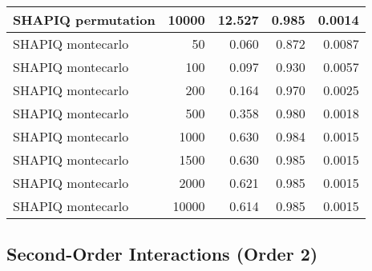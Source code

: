 \documentclass{article}
\begin{document}
\begin{table}[h!]
\begin{tabular}{lrrrr}
SHAPIQ permutation & 10000 & 12.527 & 0.985 & 0.0014 \\
\midrule
SHAPIQ montecarlo & 50 & 0.060 & 0.872 & 0.0087 \\
SHAPIQ montecarlo & 100 & 0.097 & 0.930 & 0.0057 \\
SHAPIQ montecarlo & 200 & 0.164 & 0.970 & 0.0025 \\
SHAPIQ montecarlo & 500 & 0.358 & 0.980 & 0.0018 \\
SHAPIQ montecarlo & 1000 & 0.630 & 0.984 & 0.0015 \\
SHAPIQ montecarlo & 1500 & 0.630 & 0.985 & 0.0015 \\
SHAPIQ montecarlo & 2000 & 0.621 & 0.985 & 0.0015 \\
SHAPIQ montecarlo & 10000 & 0.614 & 0.985 & 0.0015 \\
\bottomrule
\end{tabular}
\end{table}

\subsection{Second-Order Interactions (Order 2)}
\end{document}
